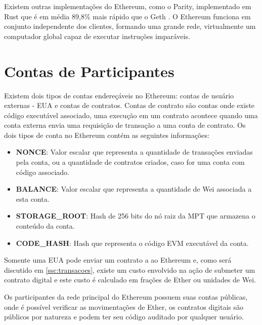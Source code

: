 \documentclass[tcc,capa]{texufpel}
\begin{document}
    Existem outras implementações do Ethereum, como o Parity, implementado em Rust que é em média 89,8\% mais rápido que o Geth \cite{rouhaniperformance}. O Ethereum funciona em conjunto independente dos clientes, formando uma grande rede, virtualmente um computador global capaz de executar instruções imparáveis.
    
    
	\section{Contas de Participantes}\label{ssc:contas-de-participantes}
	
	Existem dois tipos de contas endereçáveis no Ethereum: contas de usuário externas - EUA e contas de contratos. Contas de contrato são contas onde existe código executável associado, uma execução em um contrato acontece quando uma conta externa envia uma requisição de transação a uma conta de contrato. Os dois tipos de conta no Ethereum contém as seguintes informações:
	
	\begin{itemize}
	    \item \textbf{NONCE}: Valor escalar que representa a quantidade de transações enviadas pela conta, ou a quantidade de contratos criados, caso for uma conta com código associado.
	    \item \textbf{BALANCE}: Valor escalar que representa a quantidade de Wei associada a esta conta.
	    \item \textbf{STORAGE\_ROOT}: Hash de 256 bits do nó raiz da MPT que armazena o conteúdo da conta. 
	    \item \textbf{CODE\_HASH}: Hash que representa o código EVM executável da conta.
	\end{itemize}
	
	Somente uma EUA pode enviar um contrato a ao Ethereum e, como será discutido em \ref{ssc:transacoes}, existe um custo envolvido na ação de submeter um contrato digital e este custo é calculado em frações de Ether ou unidades de Wei.
	
	Os participantes da rede principal do Ethereum possuem suas contas públicas, onde é possível verificar as movimentações de Ether, os contratos digitais são públicos por natureza e podem ter seu código auditado por qualquer usuário.

	
\end{document}
